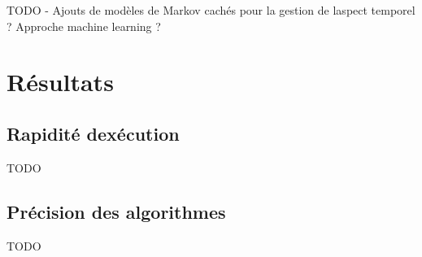 \documentclass[letterpaper]{article}
\begin{document}
TODO - Ajouts de modèles de Markov cachés pour la gestion de l\textquotesingle aspect 
temporel ? Approche machine learning ?

\section{Résultats}

\subsection{Rapidité d\textquotesingle exécution}

TODO

\subsection{Précision des algorithmes}

TODO

\footnotesize


\end{document}
